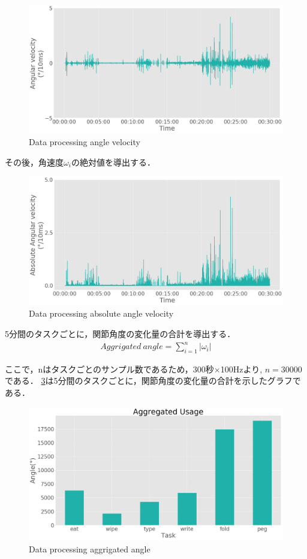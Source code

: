 \begin{figure}[H]
  \centering
  \includegraphics[width=0.8\linewidth]{fig/velocity}
  \caption{Data processing angle velocity}
  \label{fig:angle_velocity}
\end{figure}

その後，角速度$\omega_i$の絶対値を導出する．

\begin{figure}[H]
  \centering
  \includegraphics[width=0.8\linewidth]{fig/absolute_velocity}
  \caption{Data processing absolute angle velocity}
  \label{fig:abs_velocity}
\end{figure}

5分間のタスクごとに，関節角度の変化量の合計を導出する．
\begin{eqnarray}
Aggrigated\ angle  = \sum_{i=1}^n |\omega_i|
\end{eqnarray}

ここで，nはタスクごとのサンプル数であるため，300秒$\times$100Hzより,
$n=30000$である．
\ref{fig:agg_angle}は5分間のタスクごとに，関節角度の変化量の合計を示したグラフである．


\begin{figure}[H]
  \centering
  \includegraphics[width=0.8\linewidth]{fig/aggrigated_angle}
  \caption{Data processing aggrigated angle}
  \label{fig:agg_angle}
\end{figure}



